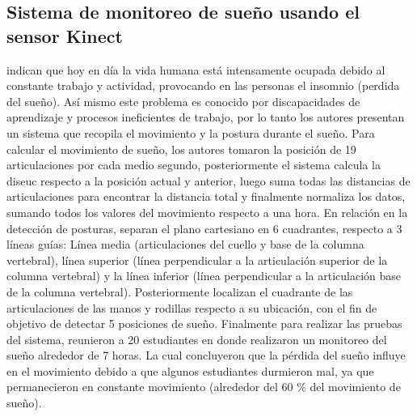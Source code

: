 \subsection{Sistema de monitoreo de sue\~no usando el sensor Kinect} \label{tr:5}
 indican que hoy en d\'ia la vida humana est\'a intensamente ocupada debido al constante trabajo y actividad, provocando en las personas el insomnio (perdida del sue\~no). As\'i mismo este problema es conocido por discapacidades de aprendizaje y procesos ineficientes de trabajo, por lo tanto los autores presentan un sistema que recopila el movimiento y la postura durante el sue\~no.
\medbreak
Para calcular el movimiento de sue\~no, los autores tomaron la posici\'on de 19 articulaciones por cada medio segundo, posteriormente el sistema calcula la \gls{diseuc} respecto a la posici\'on actual y anterior, luego suma todas las distancias de articulaciones para encontrar la distancia total y finalmente normaliza los datos, sumando todos los valores del movimiento respecto a una hora.
\medbreak
En relaci\'on en la detecci\'on de posturas,  separan el plano cartesiano en 6 cuadrantes, respecto a 3 l\'ineas gu\'ias: L\'inea media (articulaciones del cuello y base de la columna vertebral), l\'inea superior (l\'inea perpendicular a la articulaci\'on superior  de la columna vertebral) y la l\'inea inferior (l\'inea perpendicular a la articulaci\'on base  de la columna vertebral). Posteriormente localizan el cuadrante de las articulaciones de las manos y rodillas respecto a su ubicaci\'on, con el fin de objetivo de detectar 5 posiciones de sue\~no.
\medbreak
Finalmente para realizar las pruebas del sistema, reunieron a 20 estudiantes en donde realizaron un monitoreo del sue\~no alrededor de 7 horas. La cual concluyeron que la p\'erdida del sue\~no influye en el movimiento debido a que algunos estudiantes durmieron mal, ya que permanecieron en constante movimiento (alrededor del 60 \% del  movimiento de sue\~no).
